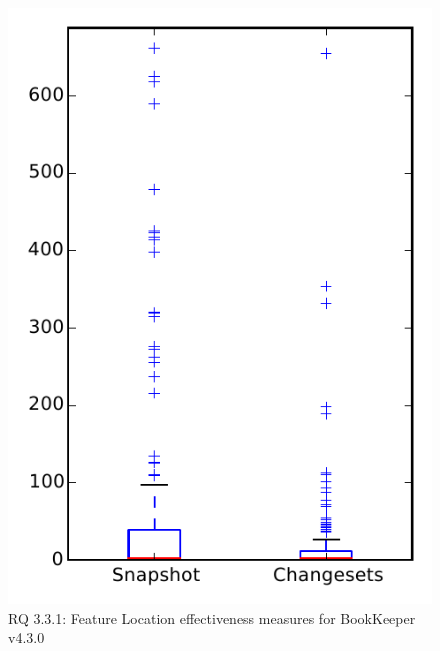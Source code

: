 
\begin{figure}
\centering
\includegraphics[height=0.4\textheight]{figures/flt/rq1_bookkeeper}
\caption{RQ 3.3.1: Feature Location effectiveness measures for BookKeeper v4.3.0}
\label{fig:flt:rq1:bookkeeper}
\end{figure}

